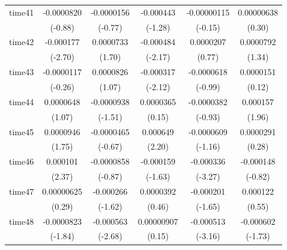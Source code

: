 \begin{table}[htbp]
\begin{tabular}{l*{5}{c}}
time41      &  -0.0000820         &  -0.0000156         &   -0.000443         & -0.00000115         &  0.00000638         \\
            &     (-0.88)         &     (-0.77)         &     (-1.28)         &     (-0.15)         &      (0.30)         \\
time42      &   -0.000177\sym{**} &   0.0000733         &   -0.000484\sym{*}  &   0.0000207         &   0.0000792         \\
            &     (-2.70)         &      (1.70)         &     (-2.17)         &      (0.77)         &      (1.34)         \\
time43      &  -0.0000117         &   0.0000826         &   -0.000317\sym{*}  &  -0.0000618         &   0.0000151         \\
            &     (-0.26)         &      (1.07)         &     (-2.12)         &     (-0.99)         &      (0.12)         \\
time44      &   0.0000648         &  -0.0000938         &   0.0000365         &  -0.0000382         &    0.000157         \\
            &      (1.07)         &     (-1.51)         &      (0.15)         &     (-0.93)         &      (1.96)         \\
time45      &   0.0000946         &  -0.0000465         &    0.000649\sym{*}  &  -0.0000609         &   0.0000291         \\
            &      (1.75)         &     (-0.67)         &      (2.20)         &     (-1.16)         &      (0.28)         \\
time46      &    0.000101\sym{*}  &  -0.0000858         &   -0.000159         &   -0.000336\sym{**} &   -0.000148         \\
            &      (2.37)         &     (-0.87)         &     (-1.63)         &     (-3.27)         &     (-0.82)         \\
time47      &  0.00000625         &   -0.000266         &   0.0000392         &   -0.000201         &    0.000122         \\
            &      (0.29)         &     (-1.62)         &      (0.46)         &     (-1.65)         &      (0.55)         \\
time48      &  -0.0000823         &   -0.000563\sym{**} &  0.00000907         &   -0.000513\sym{**} &   -0.000602         \\
            &     (-1.84)         &     (-2.68)         &      (0.15)         &     (-3.16)         &     (-1.73)         \\

\end{tabular}
\end{table}

